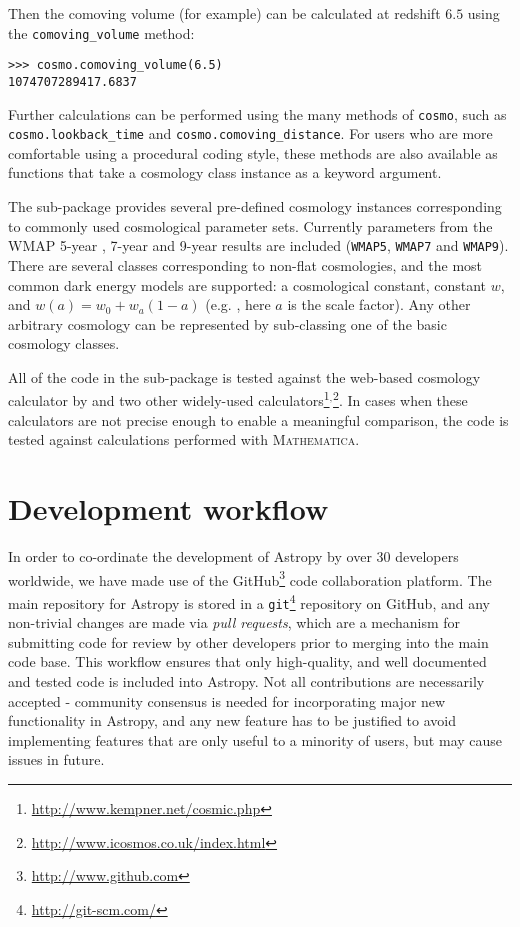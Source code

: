 \documentclass[traditabstract]{aa}
\begin{document}
\noindent Then the comoving volume (for example) can be calculated at
redshift $6.5$ using the \texttt{comoving\_volume} method:

\begin{verbatim}
>>> cosmo.comoving_volume(6.5)
1074707289417.6837
\end{verbatim}

\noindent Further calculations can be performed using the many methods
of \texttt{cosmo}, such as \texttt{cosmo.lookback\_time} and
\texttt{cosmo.comoving\_distance}.  For users who are more comfortable
using a procedural coding style, these methods are also available as
functions that take a cosmology class instance as a keyword argument.

The sub-package provides several pre-defined cosmology instances
corresponding to commonly used cosmological parameter sets. Currently
parameters from the WMAP 5-year \citep{Komatsu09}, 7-year
\citep{Komatsu11} and 9-year results \citep{Hinshaw13} are included
(\texttt{WMAP5}, \texttt{WMAP7} and \texttt{WMAP9}). There are several
classes corresponding to non-flat cosmologies, and the most common
dark energy models are supported: a cosmological constant, constant
$w$, and $w(a) = w_0 + w_a (1-a)$ (e.g. \citealt{Linder03}, here $a$
is the scale factor). Any other arbitrary cosmology can be represented
by sub-classing one of the basic cosmology classes.

All of the code in the sub-package is tested against the web-based
cosmology calculator by \citet{Wright06} and two other widely-used
calculators\footnote{\url{http://www.kempner.net/cosmic.php}}$^,$\footnote{\url{http://www.icosmos.co.uk/index.html}}.
In cases when these calculators are not precise enough to enable a
meaningful comparison, the code is tested against calculations
performed with \textsc{Mathematica}.

\section{Development workflow}

\label{sec:workflow}



In order to co-ordinate the development of Astropy by over 30 developers worldwide, we have made use of the GitHub\footnote{\url{http://www.github.com}} code collaboration platform. The main repository for Astropy is stored in a \texttt{git}\footnote{\url{http://git-scm.com/}} repository on GitHub, and any non-trivial changes are made via \textit{pull requests}, which are a mechanism for submitting code for review by other developers prior to merging into the main code base. This workflow ensures that only high-quality, and well documented and tested code is included into Astropy. Not all contributions are necessarily accepted - community consensus is needed for incorporating major new functionality in Astropy, and any new feature has to be justified to avoid implementing features that are only useful to a minority of users, but may cause issues in future.
\end{document}
